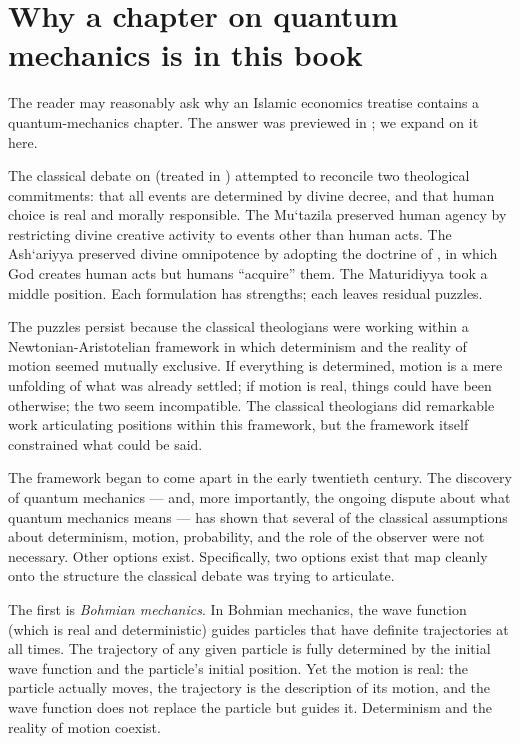 \section{Why a chapter on quantum mechanics is in this book}
\label{sec:qm-why}

The reader may reasonably ask why an Islamic economics treatise
contains a quantum-mechanics chapter. The answer was previewed in
; we expand on it here.

The classical  debate on  (treated in
) attempted to reconcile two theological commitments:
that all events are determined by divine decree, and that human
choice is real and morally responsible. The Mu`tazila preserved
human agency by restricting divine creative activity to events
other than human acts. The Ash`ariyya preserved divine omnipotence
by adopting the doctrine of , in which God creates human
acts but humans ``acquire'' them. The Maturidiyya took a middle
position. Each formulation has strengths; each leaves residual
puzzles.

The puzzles persist because the classical theologians were working
within a Newtonian-Aristotelian framework in which determinism and
the reality of motion seemed mutually exclusive. If everything is
determined, motion is a mere unfolding of what was already settled;
if motion is real, things could have been otherwise; the two seem
incompatible. The classical theologians did remarkable work
articulating positions within this framework, but the framework
itself constrained what could be said.

The framework began to come apart in the early twentieth century.
The discovery of quantum mechanics --- and, more importantly, the
ongoing dispute about what quantum mechanics means --- has shown
that several of the classical assumptions about determinism, motion,
probability, and the role of the observer were not necessary. Other
options exist. Specifically, two options exist that map cleanly onto
the structure the classical  debate was trying to
articulate.

The first is \emph{Bohmian mechanics}. In Bohmian mechanics, the
wave function (which is real and deterministic) guides particles
that have definite trajectories at all times. The trajectory of any
given particle is fully determined by the initial wave function and
the particle's initial position. Yet the motion is real: the
particle actually moves, the trajectory is the description of its
motion, and the wave function does not replace the particle but
guides it. Determinism and the reality of motion coexist.

